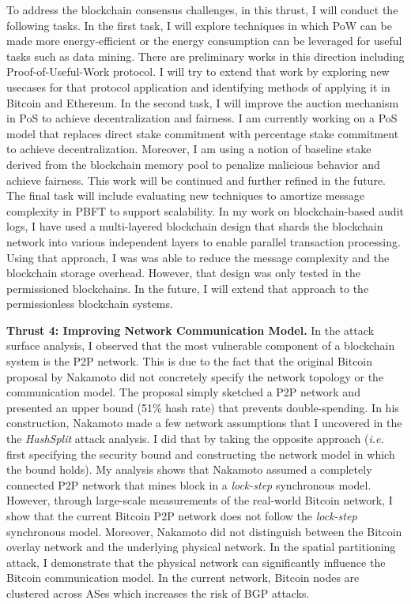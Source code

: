 \documentclass{NSF}
\newcommand{\BfPara}[1]{{\noindent\textbf{#1.}}\xspace}
\newcommand{\ie}{{\em i.e.}\xspace}
\begin{document}
To address the blockchain consensus challenges, in this thrust, I will conduct the following tasks. In the first task, I will explore techniques in which PoW can be made more energy-efficient or the energy consumption can be leveraged for useful tasks such as data mining. There are preliminary works in this direction including Proof-of-Useful-Work protocol. I will try to extend that work by exploring new usecases for that protocol application and identifying methods of applying it in Bitcoin and Ethereum. In the second task, I will improve the auction mechanism in PoS to achieve decentralization and fairness. I am currently working on a PoS model that replaces direct stake commitment with percentage stake commitment to achieve decentralization. Moreover, I am using a notion of baseline stake derived from the blockchain memory pool to penalize malicious behavior and achieve fairness. This work will be continued and further refined in the future. The final task will include evaluating new techniques to amortize message complexity in PBFT to support scalability. In my work on blockchain-based audit logs, I have used a multi-layered blockchain design that shards the blockchain network into various independent layers to enable parallel transaction processing. Using that approach, I was was able to reduce the message complexity and the blockchain storage overhead. However, that design was only tested in the permissioned blockchains. In the future, I will extend that approach to the permissionless blockchain systems. 


\vspace{2mm}


\BfPara{Thrust 4: Improving Network Communication Model} In the attack surface analysis, I observed that the most vulnerable component of a blockchain system is the P2P network. This is due to the fact that the original Bitcoin proposal by Nakamoto did not concretely specify the network topology or the communication model. The proposal simply sketched a P2P network and presented an upper bound (51\% hash rate) that prevents double-spending. In his construction, Nakamoto made a few network assumptions that I uncovered in the the {\em HashSplit} attack analysis. I did that by taking the opposite approach (\ie first specifying the security bound and constructing the network model in which the bound holds). My analysis shows that Nakamoto assumed a completely connected P2P network that mines block in a {\em lock-step} synchronous model. However, through large-scale measurements of the real-world Bitcoin network, I show that the current Bitcoin P2P network does not follow the {\em lock-step} synchronous model. Moreover, Nakamoto did not distinguish between the Bitcoin overlay network and the underlying physical network. In the spatial partitioning attack, I demonstrate that the physical network can significantly influence the Bitcoin communication model. In the current network, Bitcoin nodes are clustered across ASes which increases the risk of BGP attacks.
\end{document}
